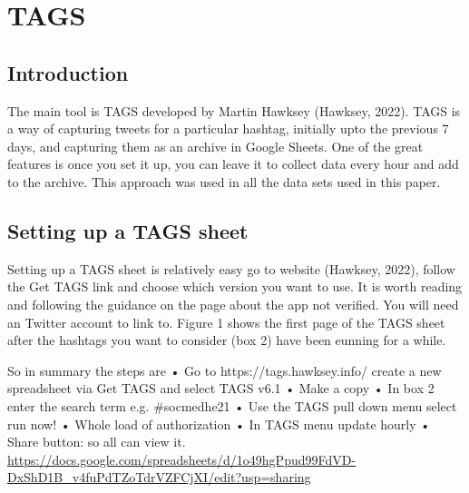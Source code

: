 \chapter{TAGS}
\section{Introduction}
The main tool is TAGS developed by Martin Hawksey (Hawksey, 2022). TAGS is a way of capturing tweets for a particular hashtag, initially upto the previous 7 days, and capturing them as an archive in Google Sheets. One of the great features is once you set it up, you can leave it to collect data every hour and add to the archive. This approach was used in all the data sets used in this paper.

\section{Setting up a TAGS sheet}
Setting up a TAGS sheet is relatively easy go to website (Hawksey, 2022), follow the Get TAGS link and choose which version you want to use. It is worth reading and following the guidance on the page about the app not verified. You will need an Twitter account to link to. 
Figure 1 shows the first page of the TAGS sheet after the hashtags you want to consider (box 2) have been eunning for a while.

So in summary the steps are
•	Go to https://tags.hawksey.info/ create a new spreadsheet via Get TAGS and select TAGS v6.1
•	Make a copy
•	In box 2 enter the search term e.g. #socmedhe21
•	Use the TAGS pull down menu select run now! 
•	Whole load of authorization
•	In TAGS menu update hourly
•	Share button: so all can view it. \url{https://docs.google.com/spreadsheets/d/1o49hgPpud99FdVD-DxShD1B_v4fuPdTZoTdrVZFCjXI/edit?usp=sharing} 
